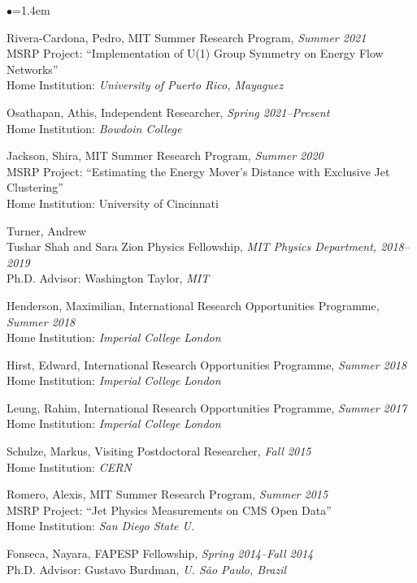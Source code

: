 \documentclass[11pt]{article}
\newcommand{\sh}{\phantom{.....}}
\newcommand{\bbl}{\begin{list}{$\bullet$}{\leftmargin=1.4em \itemsep=-1pt}}
\newcommand{\el}{\end{list}}
\begin{document}
\bbl 
\item Rivera-Cardona, Pedro, MIT Summer Research Program, \textit{Summer 2021}
\\ \sh MSRP Project: ``Implementation of U(1) Group Symmetry on Energy Flow Networks''
\\ \sh Home Institution:  \textit{University of Puerto Rico, Mayaguez}
\item  Osathapan, Athis, Independent Researcher, \textit{Spring 2021--Present}
\\ \sh Home Institution: \textit{Bowdoin College}
\item Jackson, Shira, MIT Summer Research Program, \textit{Summer 2020}
\\ \sh MSRP Project: “Estimating the Energy Mover’s Distance with Exclusive Jet Clustering”
\\ \sh Home Institution: University of Cincinnati
\item  Turner, Andrew
\\ \sh Tushar Shah and Sara Zion Physics Fellowship, \textit{MIT Physics Department, 2018--2019}
\\ \sh    Ph.D. Advisor: Washington Taylor, \textit{MIT}
\item   Henderson, Maximilian, International Research Opportunities Programme, \textit{Summer 2018}
\\ \sh Home Institution: \textit{Imperial College London}
\item  Hirst, Edward, International Research Opportunities Programme, \textit{Summer 2018}
\\ \sh Home Institution: \textit{Imperial College London}
\item Leung, Rahim, International Research Opportunities Programme, \textit{Summer 2017}
\\ \sh Home Institution: \textit{Imperial College London}
\item Schulze, Markus, Visiting Postdoctoral Researcher, \textit{Fall 2015}
\\ \sh Home Institution:  \textit{CERN}
\item Romero, Alexis, MIT Summer Research Program, \textit{Summer 2015}
\\ \sh MSRP Project: ``Jet Physics Measurements on CMS Open Data''
\\ \sh Home Institution:  \textit{San Diego State U.}
\item Fonseca, Nayara, FAPESP Fellowship, \textit{Spring 2014--Fall 2014}
\\ \sh Ph.D. Advisor:  Gustavo Burdman, \textit{U. S\~ao Paulo, Brazil}
\el
\end{document}
